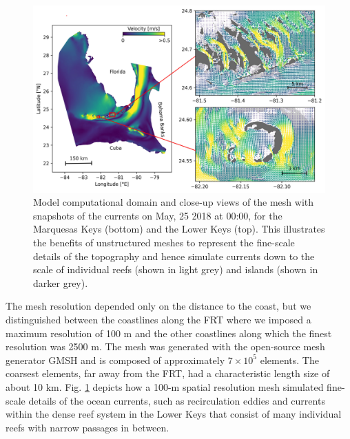 \begin{figure}
    \centering
    \includegraphics[width=.95\textwidth]{chapters/sctld/figures/vel.jpg}
    \caption{Model computational domain and close-up views of the mesh with snapshots of the currents on May, 25 2018 at 00:00, for the Marquesas Keys (bottom) and the Lower Keys (top). This illustrates the benefits of unstructured meshes to represent the fine-scale details of the topography and hence simulate currents down to the scale of individual reefs (shown in light grey) and islands (shown in darker grey).}
    \label{fig:setup}
\end{figure}

The mesh resolution depended only on the distance to the coast, but we distinguished between the coastlines along the FRT where we imposed a maximum resolution of 100 m and the other coastlines along which the finest resolution was 2500 m. The mesh was generated with the open-source mesh generator GMSH \citep{Geuzaine2009} and is composed of approximately $7 \times 10^5$ elements. The coarsest elements, far away from the FRT, had a characteristic length size of about 10 km. Fig. \ref{fig:setup} depicts how a 100-m spatial resolution mesh simulated fine-scale details of the ocean currents, such as recirculation eddies and currents within the dense reef system in the Lower Keys that consist of many individual reefs with narrow passages in between. 

